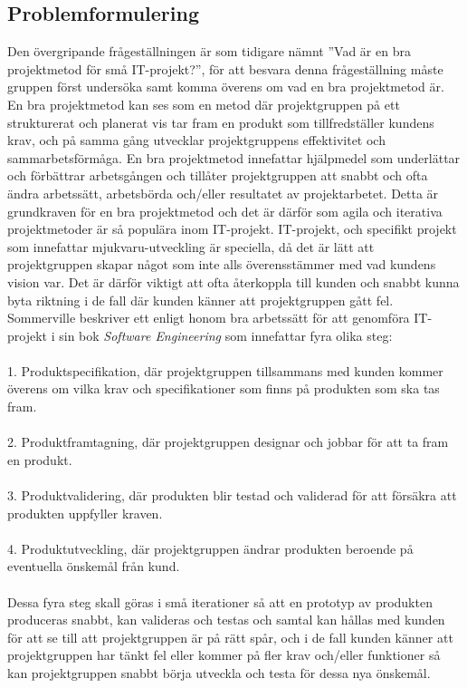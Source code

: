 \documentclass[conference]{IEEEtran}
\begin{document}
\subsection{Problemformulering}
Den övergripande frågeställningen är som tidigare nämnt ''Vad är en bra projektmetod för små IT-projekt?'',  för att besvara denna frågeställning måste gruppen först undersöka samt komma överens om vad en bra projektmetod är. En bra projektmetod kan ses som en metod där projektgruppen på ett strukturerat och planerat vis tar fram en produkt som tillfredställer kundens krav, och på samma gång utvecklar projektgruppens effektivitet och sammarbetsförmåga. En bra projektmetod innefattar hjälpmedel som underlättar och förbättrar arbetsgången och tillåter projektgruppen att snabbt och ofta ändra arbetssätt, arbetsbörda och/eller resultatet av projektarbetet. Detta är grundkraven för en bra projektmetod och det är därför som agila och iterativa projektmetoder är så populära inom IT-projekt. IT-projekt, och specifikt projekt som innefattar mjukvaru-utveckling är speciella, då det är lätt att projektgruppen skapar något som inte alls överensstämmer med vad kundens vision var. Det är därför viktigt att ofta återkoppla till kunden och snabbt kunna byta riktning i de fall där kunden känner att projektgruppen gått fel. Sommerville beskriver ett enligt honom bra arbetssätt för att genomföra IT-projekt i sin bok \textit{Software Engineering}\cite{Sommerville10} som innefattar fyra olika steg:\\
\\
1. Produktspecifikation, där projektgruppen tillsammans med kunden kommer överens om vilka krav och specifikationer som finns på produkten som ska tas fram.\\
\\
2. Produktframtagning, där projektgruppen designar och jobbar för att ta fram en produkt.\\
\\
3. Produktvalidering, där produkten blir testad och validerad för att försäkra att produkten uppfyller kraven.\\
\\
4. Produktutveckling, där projektgruppen ändrar produkten beroende på eventuella önskemål från kund.\\
\\
Dessa fyra steg skall göras i små iterationer så att en prototyp av produkten produceras snabbt, kan valideras och testas och samtal kan hållas med kunden för att se till att projektgruppen är på rätt spår, och i de fall kunden känner att projektgruppen har tänkt fel eller kommer på fler krav och/eller funktioner så kan projektgruppen snabbt börja utveckla och testa för dessa nya önskemål.
\end{document}
